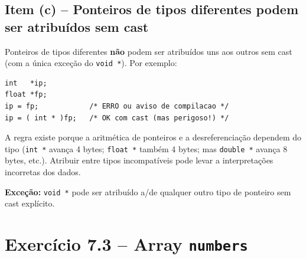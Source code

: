 \documentclass[12pt,a4paper]{article}
\begin{document}
\subsection*{Item (c) -- Ponteiros de tipos diferentes podem ser atribuídos sem cast}

\begin{tcolorbox}[colback=red!5,colframe=deitelred,title={\bfseries FALSO}]
Ponteiros de tipos diferentes \textbf{não} podem ser atribuídos uns aos outros
sem cast (com a única exceção do \texttt{void *}). Por exemplo:

\begin{lstlisting}
int   *ip;
float *fp;
ip = fp;            /* ERRO ou aviso de compilacao */
ip = ( int * )fp;   /* OK com cast (mas perigoso!) */
\end{lstlisting}

A regra existe porque a aritmética de ponteiros e a desreferenciação dependem do tipo
(\texttt{int *} avança 4 bytes; \texttt{float *} também 4 bytes; mas \texttt{double *}
avança 8 bytes, etc.). Atribuir entre tipos incompatíveis pode levar a interpretações
incorretas dos dados.

\textbf{Exceção:} \texttt{void *} pode ser atribuído a/de qualquer outro tipo de
ponteiro sem cast explícito.
\end{tcolorbox}

\newpage

\section{Exercício 7.3 -- Array \texttt{numbers}}
\end{document}
